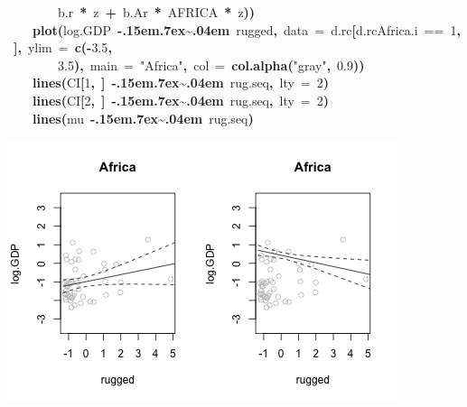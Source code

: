 \documentclass{article}
\makeatletter
\newcommand{\hlnumber}[1]{\textcolor[rgb]{0,0,0}{#1}}%
\newcommand{\hlfunctioncall}[1]{\textcolor[rgb]{.5,0,.33}{\textbf{#1}}}%
\newcommand{\hlstring}[1]{\textcolor[rgb]{.6,.6,1}{#1}}%
\newcommand{\hlkeyword}[1]{\textbf{#1}}%
\newcommand{\hlargument}[1]{\textcolor[rgb]{.69,.25,.02}{#1}}%
\newcommand{\hlsymbol}[1]{#1}%
\def\urltilda{\kern -.15em\lower .7ex\hbox{\~{}}\kern .04em}%
\newcommand{\hlstd}[1]{\textcolor[rgb]{0,0,0}{#1}}%
\newenvironment{kframe}{%
 \def\FrameCommand##1{\hskip\@totalleftmargin \hskip-\fboxsep
 \colorbox{shadecolor}{##1}\hskip-\fboxsep
     \hskip-\linewidth \hskip-\@totalleftmargin \hskip\columnwidth}%
 \MakeFramed {\advance\hsize-\width
   \@totalleftmargin\z@ \linewidth\hsize
   \@setminipage}}%
 {\par\unskip\endMakeFramed}
\newenvironment{knitrout}{}{} %
\makeatother
\begin{document}
\begin{knitrout}
{\begin{kframe}
\begin{flushleft}
\hlstd{}{\ }{\ }{\ }{\ }{\ }{\ }{\ }{\ }\hlsymbol{b.r}{\ }\hlkeyword{*}{\ }\hlsymbol{z}{\ }\hlkeyword{+}{\ }\hlsymbol{b.Ar}{\ }\hlkeyword{*}{\ }\hlsymbol{AFRICA}{\ }\hlkeyword{*}{\ }\hlsymbol{z}\hlkeyword{)}\hlkeyword{)}\hspace*{\fill}\\
\hlstd{}{\ }{\ }{\ }{\ }\hlfunctioncall{plot}\hlkeyword{(}\hlsymbol{log.GDP}{\ }\hlkeyword{\urltilda{}}{\ }\hlsymbol{rugged}\hlkeyword{,}{\ }\hlargument{data}{\ }\hlargument{=}{\ }\hlsymbol{d.rc}\hlkeyword{[}\hlsymbol{d.rc}\hlkeyword{\usebox{\hlnormalsizeboxdollar}}\hlsymbol{Africa.i}{\ }=={\ }\hlnumber{1}\hlkeyword{,}{\ }\hlkeyword{]}\hlkeyword{,}{\ }\hlargument{ylim}{\ }\hlargument{=}{\ }\hlfunctioncall{c}\hlkeyword{(}\hlkeyword{-}\hlnumber{3.5}\hlkeyword{,}\hspace*{\fill}\\
\hlstd{}{\ }{\ }{\ }{\ }{\ }{\ }{\ }{\ }\hlnumber{3.5}\hlkeyword{)}\hlkeyword{,}{\ }\hlargument{main}{\ }\hlargument{=}{\ }\hlstring{"Africa"}\hlkeyword{,}{\ }\hlargument{col}{\ }\hlargument{=}{\ }\hlfunctioncall{col.alpha}\hlkeyword{(}\hlstring{"gray"}\hlkeyword{,}{\ }\hlnumber{0.9}\hlkeyword{)}\hlkeyword{)}\hspace*{\fill}\\
\hlstd{}{\ }{\ }{\ }{\ }\hlfunctioncall{lines}\hlkeyword{(}\hlsymbol{CI}\hlkeyword{[}\hlnumber{1}\hlkeyword{,}{\ }\hlkeyword{]}{\ }\hlkeyword{\urltilda{}}{\ }\hlsymbol{rug.seq}\hlkeyword{,}{\ }\hlargument{lty}{\ }\hlargument{=}{\ }\hlnumber{2}\hlkeyword{)}\hspace*{\fill}\\
\hlstd{}{\ }{\ }{\ }{\ }\hlfunctioncall{lines}\hlkeyword{(}\hlsymbol{CI}\hlkeyword{[}\hlnumber{2}\hlkeyword{,}{\ }\hlkeyword{]}{\ }\hlkeyword{\urltilda{}}{\ }\hlsymbol{rug.seq}\hlkeyword{,}{\ }\hlargument{lty}{\ }\hlargument{=}{\ }\hlnumber{2}\hlkeyword{)}\hspace*{\fill}\\
\hlstd{}{\ }{\ }{\ }{\ }\hlfunctioncall{lines}\hlkeyword{(}\hlsymbol{mu}{\ }\hlkeyword{\urltilda{}}{\ }\hlsymbol{rug.seq}\hlkeyword{)}\hspace*{\fill}\\
\hlstd{}\hlkeyword{\usebox{\hlnormalsizeboxclosebrace}}\mbox{}
\normalfont
\end{flushleft}
\includegraphics{with-sey} \begin{flushleft}

\end{flushleft}
\end{kframe}}
\end{knitrout}
\end{document}
